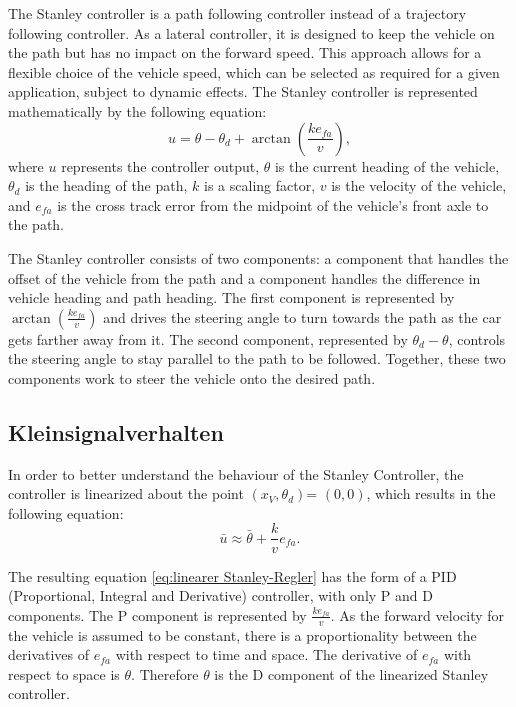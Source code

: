 \documentclass[arbeit=studie,oneside,BCOR=12mm]{ArbeitRST}
\begin{document}
The Stanley controller is a path following controller instead of a trajectory
following controller. As a lateral controller, it is designed to keep the
vehicle on the path but has no impact on the forward speed. This approach
allows for a flexible choice of the vehicle speed, which can be selected as
required for a given application, subject to dynamic effects. The Stanley
controller is represented mathematically by the following equation: 
\begin{equation} 
    u = \theta - \theta_d +
    \arctan\left(\frac{ke_{fa}}{v}\right), 
    \label{eq:Stanley-Regler} 
\end{equation}
where $u$ represents the controller output, $\theta$ is the current heading of
the vehicle, $\theta_d$ is the heading of the path, $k$ is a scaling factor,
$v$ is the velocity of the vehicle, and $e_{fa}$ is the cross track error from
the midpoint of the vehicle's front axle to the path.

The Stanley controller consists of two components: a component that handles the
offset of the vehicle from the path and a component handles the difference in
vehicle heading and path heading. The first component is represented by
$\arctan(\frac{ke_{fa}}{v})$ and drives the steering angle to turn towards the
path as the car gets farther away from it. The second component, represented by
$\theta_d - \theta$, controls the steering angle to stay parallel to the path
to be followed. Together, these two components work to steer the vehicle onto
the desired path.

\subsection{Kleinsignalverhalten}

In order to better understand the behaviour of the Stanley Controller, the
controller is linearized about the point \(\left(x_V, \theta_d\right)\)=
\(\left(0, 0\right)\), which results in the following equation:
\begin{equation} 
    \bar{u} \approx \bar{\theta} + \frac{k}{v}e_{fa}.
    \label{eq:linearer Stanley-Regler} 
\end{equation}

The resulting equation \eqref{eq:linearer Stanley-Regler} has the form of a PID
(Proportional, Integral and Derivative) controller, with only P and D
components. The P component is represented by \(\frac{ke_{fa}}{v}\). As the
forward velocity for the vehicle is assumed to be constant, there is a
proportionality between the derivatives of \(e_{fa}\) with respect to time and
space. The derivative of \(e_{fa}\) with respect to space is \(\theta\).
Therefore \(\theta\) is the D component of the linearized Stanley controller.
\end{document}
